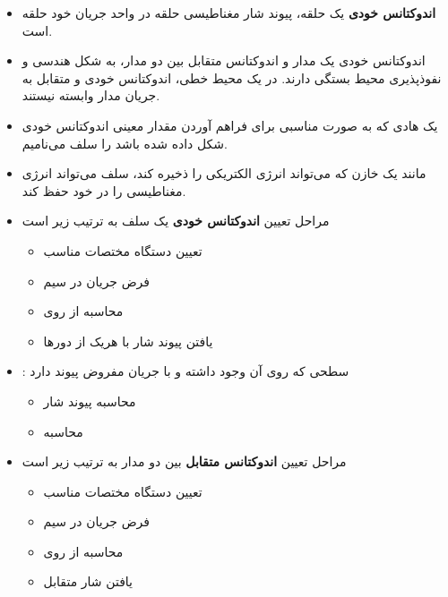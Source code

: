 \begin{ELunit}

\begin{itemize}
\tightlist
\item
  \textbf{اندوکتانس خودی} یک حلقه، پیوند شار مغناطیسی حلقه در واحد جریان خود حلقه است.
\item
  اندوکتانس خودی یک مدار و اندوکتانس متقابل بین دو مدار، به شکل هندسی و نفوذپذیری محیط بستگی دارند. در یک محیط خطی، اندوکتانس خودی و متقابل به جریان مدار وابسته نیستند.
\item
  یک هادی که به صورت مناسبی برای فراهم آوردن مقدار معینی اندوکتانس خودی شکل داده شده باشد را سلف می‌نامیم.
\item
  مانند یک خازن که می‌تواند انرژی الکتریکی را ذخیره کند، سلف می‌تواند انرژی مغناطیسی را در خود حفظ کند.
\item
  مراحل تعیین \textbf{اندوکتانس خودی} یک سلف به ترتیب زیر است

  \begin{itemize}
  \tightlist
  \item
    تعیین دستگاه مختصات مناسب
  \item
    فرض جریان  در سیم
  \item
    محاسبه  از روی 
  \item
    یافتن پیوند شار با هریک از دورها
  \end{itemize}
\end{itemize}


\begin{itemize}
\tightlist
\item
  : سطحی که روی آن  وجود داشته و با جریان مفروض پیوند دارد

  \begin{itemize}
  \tightlist
  \item
    محاسبه پیوند شار
  \item
    محاسبه 
  \end{itemize}
\end{itemize}


\begin{itemize}
\tightlist
\item
  مراحل تعیین \textbf{اندوکتانس متقابل} بین دو مدار به ترتیب زیر است

  \begin{itemize}
  \tightlist
  \item
    تعیین دستگاه مختصات مناسب
  \item
    فرض جریان  در سیم
  \item
    محاسبه  از روی 
  \item
    یافتن شار متقابل
  \end{itemize}
\end{itemize}


\end{ELunit}
